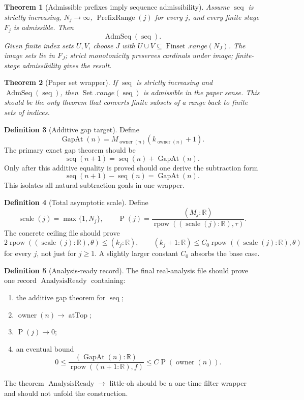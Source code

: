 \documentclass[11pt]{article}
\theoremstyle{definition}
\newtheorem{definition}{Definition}[section]
\theoremstyle{plain}
\newtheorem{theorem}[definition]{Theorem}
\theoremstyle{remark}
\newcommand{\R}{\mathbb{R}}
\newcommand{\Finset}{\operatorname{Finset}}
\newcommand{\Set}{\operatorname{Set}}
\newcommand{\owner}{\operatorname{owner}}
\newcommand{\seq}{\operatorname{seq}}
\newcommand{\thetaC}{\theta}
\newcommand{\tauC}{\tau}
\newcommand{\fexp}{f}
\newcommand{\rpow}{\operatorname{rpow}}
\newcommand{\atTop}{\operatorname{atTop}}
\newcommand{\Pfun}{\operatorname{P}}
\newcommand{\Scale}{\operatorname{scale}}
\newcommand{\AdmSeq}{\operatorname{AdmSeq}}
\newcommand{\PrefixRange}{\operatorname{PrefixRange}}
\newcommand{\GapAt}{\operatorname{GapAt}}
\newcommand{\AnalysisReady}{\operatorname{AnalysisReady}}
\begin{document}
\begin{theorem}[Admissible prefixes imply sequence admissibility]\label{thm:v10-admseq-from-prefixes}
Assume \(\seq\) is strictly increasing, \(N_j\to\infty\), \(\PrefixRange(j)\) for every \(j\), and every finite stage \(F_j\) is admissible.  Then
\[
        \AdmSeq(\seq).
\]
Given finite index sets \(U,V\), choose \(J\) with \(U\cup V\subseteq\Finset.range(N_J)\).  The image sets lie in \(F_J\); strict monotonicity preserves cardinals under image; finite-stage admissibility gives the result.
\end{theorem}

\begin{theorem}[Paper set wrapper]\label{thm:v10-paper-set-wrapper}
If \(\seq\) is strictly increasing and \(\AdmSeq(\seq)\), then \(\Set.range(\seq)\) is admissible in the paper sense.  This should be the only theorem that converts finite subsets of a range back to finite sets of indices.
\end{theorem}

\begin{definition}[Additive gap target]\label{def:v10-gapat}
Define
\[
        \GapAt(n)=M_{\owner(n)}(k_{\owner(n)}+1).
\]
The primary exact gap theorem should be
\[
        \seq(n+1)=\seq(n)+\GapAt(n).
\]
Only after this additive equality is proved should one derive the subtraction form
\[
        \seq(n+1)-\seq(n)=\GapAt(n).
\]
This isolates all natural-subtraction goals in one wrapper.
\end{definition}

\begin{definition}[Total asymptotic scale]\label{def:v10-scale}
Define
\[
        \Scale(j)=\max\{1,N_j\},
        \qquad
        \Pfun(j)=\frac{(M_j:\R)}{\rpow((\Scale(j):\R),\tauC)}.
\]
The concrete ceiling file should prove
\[
        2\rpow((\Scale(j):\R),\thetaC)\le(k_j:\R),
        \qquad
        (k_j+1:\R)\le C_0\rpow((\Scale(j):\R),\thetaC)
\]
for every \(j\), not just for \(j\ge1\).  A slightly larger constant \(C_0\) absorbs the base case.
\end{definition}

\begin{definition}[Analysis-ready record]\label{def:v10-analysis-ready}
The final real-analysis file should prove one record \(\AnalysisReady\) containing:
\begin{enumerate}[label=(\arabic*), leftmargin=*]
\item the additive gap theorem for \(\seq\);
\item \(\owner(n)\to\atTop\);
\item \(\Pfun(j)\to0\);
\item an eventual bound
\[
        0\le\frac{(\GapAt(n):\R)}{\rpow((n+1:\R),\fexp)}
        \le C\Pfun(\owner(n)).
\]
\end{enumerate}
The theorem \(\AnalysisReady\to\) little-oh should be a one-time filter wrapper and should not unfold the construction.
\end{definition}
\end{document}

